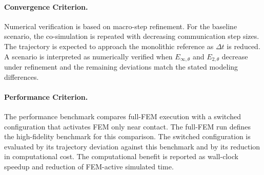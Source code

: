 \paragraph{Convergence Criterion.}
Numerical verification is based on macro-step refinement.
For the baseline scenario, the co-simulation is repeated with decreasing communication step sizes.
The trajectory is expected to approach the monolithic reference as \(\Delta t\) is reduced.
A scenario is interpreted as numerically verified when \(E_{\infty,\theta}\) and \(E_{2,\theta}\) decrease under refinement and the remaining deviations match the stated modeling differences.

\paragraph{Performance Criterion.}
The performance benchmark compares full-\ac{FEM} execution with a switched configuration that activates \ac{FEM} only near contact.
The full-\ac{FEM} run defines the high-fidelity benchmark for this comparison.
The switched configuration is evaluated by its trajectory deviation against this benchmark and by its reduction in computational cost.
The computational benefit is reported as wall-clock speedup and reduction of \ac{FEM}-active simulated time.
